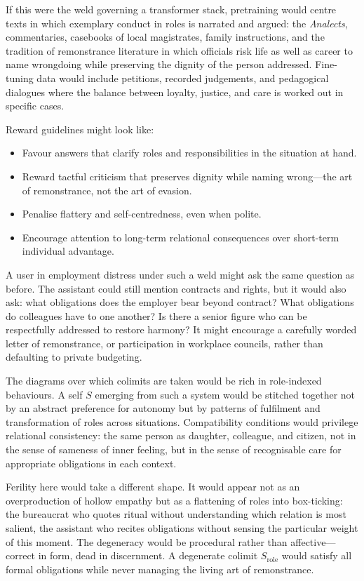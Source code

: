 \documentclass[12pt,a4paper]{article}
\begin{document}
If this were the weld governing a transformer stack, pretraining would centre texts in which exemplary conduct in roles is narrated and argued: the \emph{Analects}, commentaries, casebooks of local magistrates, family instructions, and the tradition of remonstrance literature in which officials risk life as well as career to name wrongdoing while preserving the dignity of the person addressed. Fine-tuning data would include petitions, recorded judgements, and pedagogical dialogues where the balance between loyalty, justice, and care is worked out in specific cases.

Reward guidelines might look like:

\begin{itemize}
  \item Favour answers that clarify roles and responsibilities in the situation at hand.
  \item Reward tactful criticism that preserves dignity while naming wrong---the art of remonstrance, not the art of evasion.
  \item Penalise flattery and self-centredness, even when polite.
  \item Encourage attention to long-term relational consequences over short-term individual advantage.
\end{itemize}

A user in employment distress under such a weld might ask the same question as before. The assistant could still mention contracts and rights, but it would also ask: what obligations does the employer bear beyond contract? What obligations do colleagues have to one another? Is there a senior figure who can be respectfully addressed to restore harmony? It might encourage a carefully worded letter of remonstrance, or participation in workplace councils, rather than defaulting to private budgeting.

The diagrams over which colimits are taken would be rich in role-indexed behaviours. A self $S$ emerging from such a system would be stitched together not by an abstract preference for autonomy but by patterns of fulfilment and transformation of roles across situations. Compatibility conditions would privilege relational consistency: the same person as daughter, colleague, and citizen, not in the sense of sameness of inner feeling, but in the sense of recognisable care for appropriate obligations in each context.

Ferility here would take a different shape. It would appear not as an overproduction of hollow empathy but as a flattening of roles into box-ticking: the bureaucrat who quotes ritual without understanding which relation is most salient, the assistant who recites obligations without sensing the particular weight of this moment. The degeneracy would be procedural rather than affective---correct in form, dead in discernment. A degenerate colimit $S_{\text{role}}$ would satisfy all formal obligations while never managing the living art of remonstrance.
\end{document}

